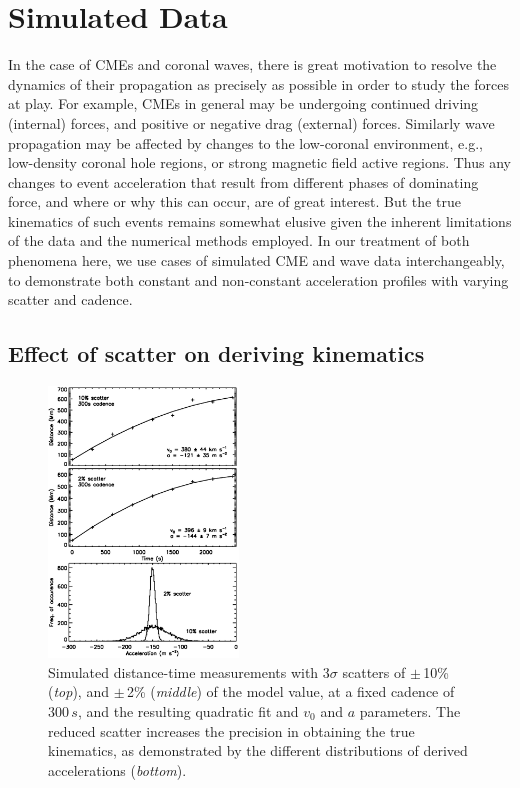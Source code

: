 \documentclass[structabstract]{aa}
\begin{document}
\section{Simulated Data}
\label{sect:simul1}

In the case of CMEs and coronal waves, there is great motivation to resolve the dynamics of their propagation as precisely as possible in order to study the forces at play. For example, CMEs in general may be undergoing continued driving (internal) forces, and positive or negative drag (external) forces. Similarly wave propagation may be affected by changes to the low-coronal environment, e.g., low-density coronal hole regions, or strong magnetic field active regions. Thus any changes to event acceleration that result from different phases of dominating force, and where or why this can occur, are of great interest. But the true kinematics of such events remains somewhat elusive given the inherent limitations of the data and the numerical methods employed. In our treatment of both phenomena here, we use cases of simulated CME and wave data interchangeably, to demonstrate both constant and non-constant acceleration profiles with varying scatter and cadence.


\subsection{Effect of scatter on deriving kinematics}
\label{subsect:noise}

\begin{figure}[!t]
\begin{center}
\includegraphics[width = 0.45\textwidth]{images/noise_hist_weight.eps}
\caption{Simulated distance-time measurements with 3$\sigma$ scatters of $\pm$\,10\% (\emph{top}), and $\pm$\,2\% (\emph{middle}) of the model value, at a fixed cadence of $300\,s$, and the resulting quadratic fit and $v_0$ and $a$ parameters. The reduced scatter increases the precision in obtaining the true kinematics, as demonstrated by the different distributions of derived accelerations (\emph{bottom}).}
\label{noise_hist_weight}
\end{center}
\end{figure}
\end{document}

